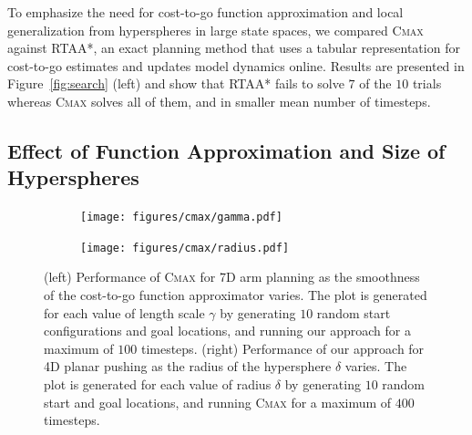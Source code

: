 To emphasize the need for cost-to-go function approximation and
local generalization from hyperspheres in large state spaces, we compared \textsc{Cmax}
against RTAA*, an exact planning method that uses a tabular
representation for cost-to-go estimates and updates model dynamics
online. Results are presented in 
Figure~\ref{fig:search} (left) and show that RTAA* fails to solve $7$
of the $10$ trials whereas \textsc{Cmax} solves all of them, and in
smaller mean number of timesteps.


\subsection{Effect of Function Approximation and Size of Hyperspheres}
\label{sec:underst-effect-funct}
\begin{figure}[t]
  \centering
  \begin{subfigure}{0.4\linewidth}
    \texttt{[image: figures/cmax/gamma.pdf]}
  \end{subfigure}
  \hspace{10mm}
  \begin{subfigure}{0.4\linewidth}
    \texttt{[image: figures/cmax/radius.pdf]}
  \end{subfigure}
  \caption{(left) Performance of \textsc{Cmax} for 7D arm planning as
    the smoothness of the cost-to-go function approximator varies. The plot is
    generated for each value of length scale $\gamma$ by generating
    $10$ random start configurations and goal locations, and running
    our approach for a maximum of $100$ timesteps. (right) Performance
    of our approach for 4D planar pushing as the radius of the
    hypersphere $\delta$ varies. The plot is generated for each value
    of radius $\delta$ by generating $10$ random start and goal
    locations, and running \textsc{Cmax} for a maximum of $400$ timesteps.}
  \label{fig:gamma-radius}
  
\end{figure}

